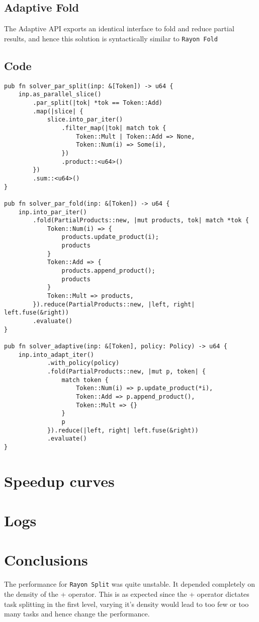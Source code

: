 \subsection{Adaptive Fold}
The Adaptive API exports an identical interface to fold and reduce partial results, and hence this solution is syntactically similar to \texttt{Rayon Fold}
\subsection{Code}
\begin{verbatim}
pub fn solver_par_split(inp: &[Token]) -> u64 {
    inp.as_parallel_slice()
        .par_split(|tok| *tok == Token::Add)
        .map(|slice| {
            slice.into_par_iter()
                .filter_map(|tok| match tok {
                    Token::Mult | Token::Add => None,
                    Token::Num(i) => Some(i),
                })
                .product::<u64>()
        })
        .sum::<u64>()
}

pub fn solver_par_fold(inp: &[Token]) -> u64 {
    inp.into_par_iter()
        .fold(PartialProducts::new, |mut products, tok| match *tok {
            Token::Num(i) => {
                products.update_product(i);
                products
            }
            Token::Add => {
                products.append_product();
                products
            }
            Token::Mult => products,
        }).reduce(PartialProducts::new, |left, right| left.fuse(&right))
        .evaluate()
}

pub fn solver_adaptive(inp: &[Token], policy: Policy) -> u64 {
    inp.into_adapt_iter()
            .with_policy(policy)
            .fold(PartialProducts::new, |mut p, token| {
                match token {
                    Token::Num(i) => p.update_product(*i),
                    Token::Add => p.append_product(),
                    Token::Mult => {}
                }
                p
            }).reduce(|left, right| left.fuse(&right))
            .evaluate()
}
\end{verbatim}
\section{Speedup curves}
\section{Logs} %
\section{Conclusions}
The performance for \texttt{Rayon Split} was quite unstable. It depended completely on the density of the + operator. This is as expected since the + operator dictates task splitting in the first level, varying it's density would lead to too few or too many tasks and hence change the performance.

